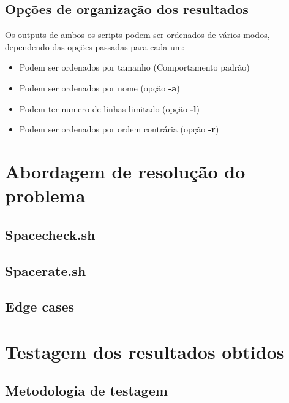 \documentclass[11pt, a4paper]{report}
\begin{document}
\section{Opções de organização dos resultados}
Os outputs de ambos os scripts podem ser ordenados de vários modos, dependendo das opções passadas para cada um:
\begin{itemize}
    \item Podem ser ordenados por tamanho (Comportamento padrão)
    \item Podem ser ordenados por nome (opção \textbf{-a})
    \item Podem ter numero de linhas limitado (opção \textbf{-l})
    \item Podem ser ordenados por ordem contrária (opção \textbf{-r})
\end{itemize}
\newpage
\chapter{Abordagem de resolução do problema}
\section{Spacecheck.sh}
\newpage
\section{Spacerate.sh}
\section{Edge cases}
\newpage
\chapter{Testagem dos resultados obtidos}
\section{Metodologia de testagem}
\nocite{*}
\printbibliography[heading=bibintoc]
\end{document}
